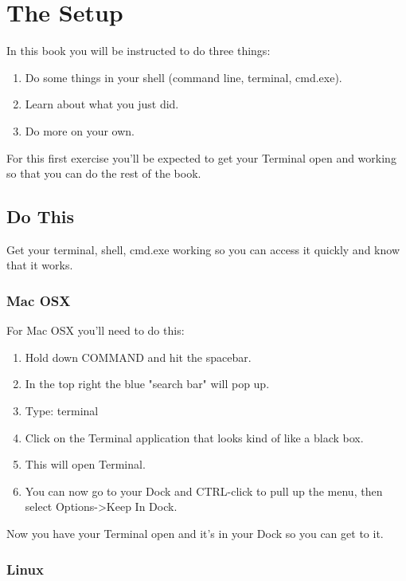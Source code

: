\chapter{The Setup}

In this book you will be instructed to do three things:

\begin{enumerate}
\item Do some things in your shell (command line, terminal, cmd.exe).
\item Learn about what you just did.
\item Do more on your own.
\end{enumerate}

For this first exercise you'll be expected to get your Terminal open and working so that you can do
the rest of the book.

\section{Do This}

Get your terminal, shell, cmd.exe working so you can access it quickly and know that it works.

\subsection{Mac OSX}

For Mac OSX you'll need to do this:

\begin{enumerate}
\item Hold down COMMAND and hit the spacebar.
\item In the top right the blue "search bar" will pop up.
\item Type:  terminal
\item Click on the Terminal application that looks kind of like a black box.
\item This will open Terminal.
\item You can now go to your Dock and CTRL-click to pull up the menu, then select Options->Keep In Dock.
\end{enumerate}

Now you have your Terminal open and it's in your Dock so you can get to it.

\subsection{Linux}

